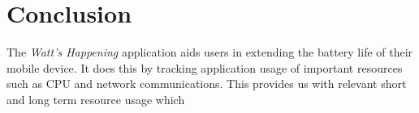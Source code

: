 \section*{Conclusion}


The \emph{Watt's Happening} application aids users in extending the battery life of their mobile device.
It does this by tracking application usage of important resources such as CPU and network communications.
This  provides us with relevant short and long term resource usage which 
